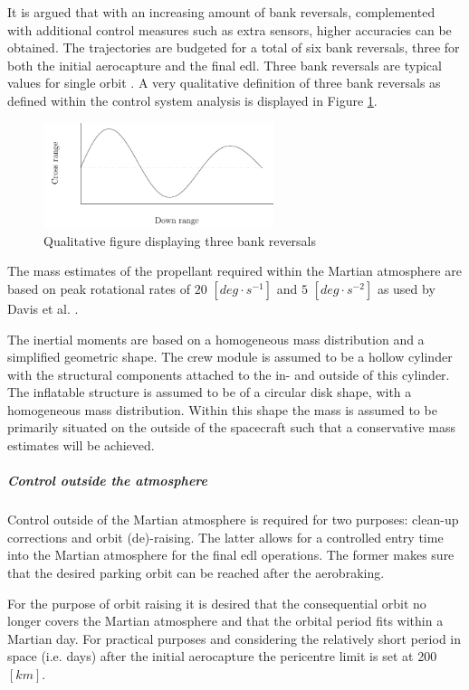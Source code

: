 It is argued that with an increasing amount of bank reversals, complemented with additional control measures such as extra sensors, higher accuracies can be obtained. The trajectories are budgeted for a total of six bank reversals, three for both the initial aerocapture and the final \gls{edl}. Three bank reversals are typical values for single orbit \cite{Lu2007, Cianciolo2010}. A very qualitative definition of three bank reversals as defined within the control system analysis is displayed in Figure \ref{fig:bankdef}.

\begin{figure}[h]
	\centering
	\includegraphics[width=0.6\textwidth]{./Figure/control/Cont.pdf}
	\caption{Qualitative figure displaying three bank reversals}
	\label{fig:bankdef}
\end{figure}

The mass estimates of the propellant required within the Martian atmosphere are based on peak rotational rates of $20$ $[deg\cdot s^{-1}]$ and $5$ $[deg \cdot s^{-2}]$ as used by Davis et al. \cite{Davis2010}.

The inertial moments are based on a homogeneous mass distribution and a simplified geometric shape. The crew module is assumed to be a hollow cylinder with the structural components attached to the in- and outside of this cylinder. The inflatable structure is assumed to be of a circular disk shape, with a homogeneous mass distribution. Within this shape the mass is assumed to be primarily situated on the outside of the spacecraft such that a conservative mass estimates will be achieved.

\subparagraph{Control outside the atmosphere}
Control outside of the Martian atmosphere is required for two purposes: clean-up corrections and orbit (de)-raising. The latter allows for a controlled entry time into the Martian atmosphere for the final \gls{edl} operations. The former makes sure that the desired parking orbit can be reached after the aerobraking.

For the purpose of orbit raising it is desired that the consequential orbit no longer covers the Martian atmosphere and that the orbital period fits within a Martian day. For practical purposes and considering the relatively short period in space (i.e. days) after the initial aerocapture the pericentre limit is set at 200 $[km]$. 

